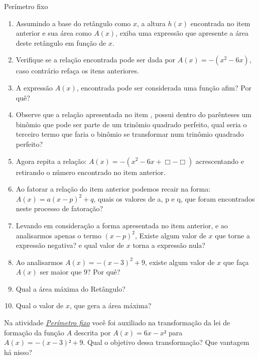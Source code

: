 \begin{task}{Perímetro fixo}
\begin{enumerate}
\item {} 
Assumindo a base do retângulo como \(x\), a altura \(h(x)\) encontrada no item anterior e sua área como \(A(x)\), exiba uma expressão que apresente a área deste retângulo em função de \(x\).

\item {} 
Verifique se a relação encontrada pode ser dada por \(A(x)=-(x^2-6x)\), caso contrário refaça os itens anteriores.

\item {} 
A expressão \(A(x)\), encontrada pode ser considerada uma função afim? Por quê?

\item {} 
Observe que a relação apresentada no item , possui dentro do parênteses um binômio que pode ser parte de um trinômio quadrado perfeito, qual seria o terceiro termo que faria o binômio se transformar num trinômio quadrado perfeito?

\item {} 
Agora repita a relação: \(A(x)=-(x^2-6x+\Box -\Box)\) acrescentando e retirando o número encontrado no item anterior.

\item {} 
Ao fatorar a relação do item anterior podemos recair na forma: \(A(x)=a(x-p)^2+q\), quais os valores de a, p e q, que foram encontrados neste processo de fatoração?

\item {} 
Levando em consideração a forma apresentada no item anterior, e ao analisarmos apenas o termo \((x-p)^2\), Existe algum valor de \(x\) que torne a expressão negativa? e qual valor de \(x\) torna a expressão nula?

\item {} 
Ao analisarmos \(A(x)=-(x-3)^2+9\), existe algum valor de \(x\) que faça \(A(x)\) ser maior que \(9\)? Por quê?

\item {} 
Qual a área máxima do Retângulo?

\item {} \begin{tikzpicture}

\end{tikzpicture}
Qual o valor de \(x\), que gera a área máxima?

\end{enumerate}
\end{task}

\label{\detokenize{AF209-3:sec-funcao-quadratica-org-ideias-quad-max-min-na-quadratica}}\label{\detokenize{AF209-3:organizando-as-ideias-maximos-ou-minimos}}
Na atividade \hyperref[\detokenize{AF209-3:sub-ativ-funcao-quadratica-perimetro-fixo}]{\textit{Perímetro fixo}} você foi auxiliado na transformação da lei de formação da função \(A\) descrita por \(A(x)=6x-x²\) para \(A(x)=-(x-3)²+9\). Qual o objetivo dessa transformação? Que vantagem há nisso?


